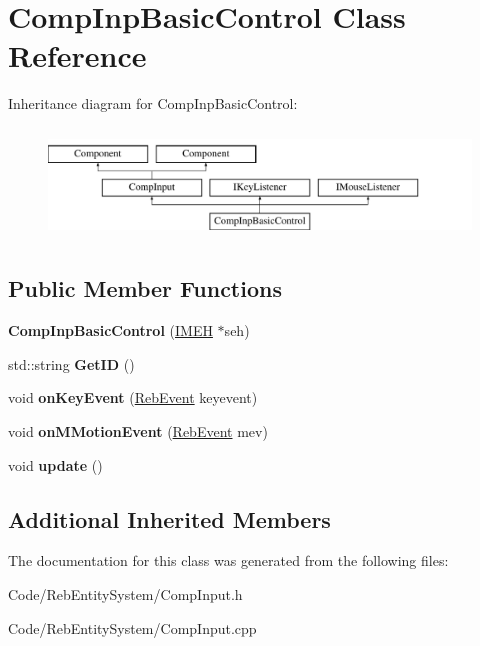 \hypertarget{class_comp_inp_basic_control}{}\section{Comp\+Inp\+Basic\+Control Class Reference}
\label{class_comp_inp_basic_control}
Inheritance diagram for Comp\+Inp\+Basic\+Control\+:\begin{figure}[H]
\begin{center}
\leavevmode
\includegraphics[height=2.978723cm]{class_comp_inp_basic_control}
\end{center}
\end{figure}
\subsection*{Public Member Functions}
\begin{DoxyCompactItemize}
\item 
{\bfseries Comp\+Inp\+Basic\+Control} (\hyperlink{class_i_m_e_h}{I\+M\+EH} $\ast$seh)\hypertarget{class_comp_inp_basic_control_a8ce8cf589006e312635f93e69af47fd7}{}\label{class_comp_inp_basic_control_a8ce8cf589006e312635f93e69af47fd7}

\item 
std\+::string {\bfseries Get\+ID} ()\hypertarget{class_comp_inp_basic_control_ac39216e5350792ddf537bfc4fedd0b3a}{}\label{class_comp_inp_basic_control_ac39216e5350792ddf537bfc4fedd0b3a}

\item 
void {\bfseries on\+Key\+Event} (\hyperlink{union_reb_event}{Reb\+Event} keyevent)\hypertarget{class_comp_inp_basic_control_a76db109690c6bd5be6b5cd128db232f6}{}\label{class_comp_inp_basic_control_a76db109690c6bd5be6b5cd128db232f6}

\item 
void {\bfseries on\+M\+Motion\+Event} (\hyperlink{union_reb_event}{Reb\+Event} mev)\hypertarget{class_comp_inp_basic_control_a104a9df471fe46be6b135ec7ebc79b6b}{}\label{class_comp_inp_basic_control_a104a9df471fe46be6b135ec7ebc79b6b}

\item 
void {\bfseries update} ()\hypertarget{class_comp_inp_basic_control_aa42c5f36ba3a45d98b793da7f0774756}{}\label{class_comp_inp_basic_control_aa42c5f36ba3a45d98b793da7f0774756}

\end{DoxyCompactItemize}
\subsection*{Additional Inherited Members}


The documentation for this class was generated from the following files\+:\begin{DoxyCompactItemize}
\item 
Code/\+Reb\+Entity\+System/Comp\+Input.\+h\item 
Code/\+Reb\+Entity\+System/Comp\+Input.\+cpp\end{DoxyCompactItemize}
